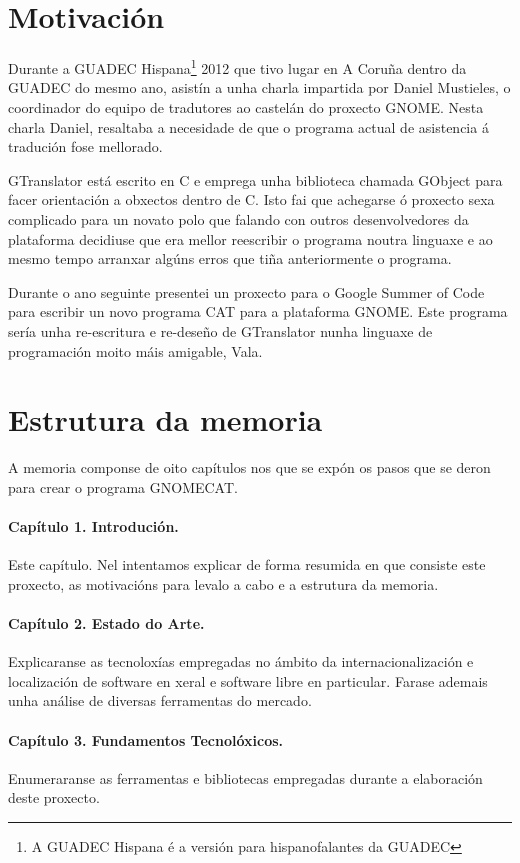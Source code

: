 \section{Motivación}
Durante a GUADEC Hispana\footnote{A GUADEC Hispana é a versión para hispanofalantes da GUADEC} 2012 que tivo lugar en A Coruña dentro da GUADEC do mesmo ano, asistín a unha charla impartida por Daniel Mustieles, o coordinador do equipo de tradutores ao castelán do proxecto GNOME. Nesta charla Daniel, resaltaba a necesidade de que o programa actual de asistencia á tradución fose mellorado.

GTranslator está escrito en C e emprega unha biblioteca chamada GObject para facer orientación a obxectos dentro de C. Isto fai que achegarse ó proxecto sexa complicado para un novato polo que falando con outros desenvolvedores da plataforma decidiuse que era mellor reescribir o programa noutra linguaxe e ao mesmo tempo arranxar algúns erros que tiña anteriormente o programa.

Durante o ano seguinte presentei un proxecto para o Google Summer of Code para escribir un novo programa CAT para a plataforma GNOME. Este programa sería unha re-escritura e re-deseño de GTranslator nunha linguaxe de programación moito máis amigable, Vala.

\section{Estrutura da memoria}

A memoria componse de oito capítulos nos que se expón os pasos que se deron para crear o programa GNOMECAT.

\paragraph*{Capítulo 1. Introdución.}
Este capítulo. Nel intentamos explicar de forma resumida en que consiste este proxecto, as motivacións para levalo a cabo e a estrutura da memoria.

\paragraph*{Capítulo 2. Estado do Arte.}
Explicaranse as tecnoloxías empregadas no ámbito da internacionalización e localización de software en xeral e software libre en particular. Farase ademais unha análise de diversas ferramentas do mercado.

\paragraph*{Capítulo 3. Fundamentos Tecnolóxicos.}
Enumeraranse as ferramentas e bibliotecas empregadas durante a elaboración deste proxecto.


